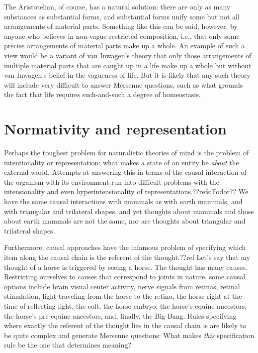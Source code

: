 The Aristotelian, of course, has a natural solution: there are only as many substances as substantial forms, and 
substantial forms unify some but not all arrangements of material parts. Something like this can be said, however,
by anyone who believes in non-vague restricted composition, i.e., that only some precise arrangements of material parts 
make up a whole. An example of such a view would be a variant of van Inwagen's theory that only those arrangements of multiple material parts that are 
caught up in a life make up a whole but without van Inwagen's belief in the vagueness of life. 
But it is likely that any such theory will include very difficult to answer Mersenne questions, such as 
what grounds the fact that life requires such-and-such a degree of homeostasis.

\section{Normativity and representation}
Perhaps the toughest problem for naturalistic theories of mind is the problem of intentionality or representation:
what makes a state of an entity be \textit{about} the external world. Attempts at answering this in terms of the 
causal interaction of the organism with its environment run into difficult problems with the intensionality and 
even hyperintensionality of representations.??refs:Fodor?? We have the same causal interactions with mammals as with earth mammals,
and with triangular and trilateral shapes, and yet thoughts about mammals and those about earth mammals are not the same,
nor are thoughts about triangular and trilateral shapes. 

Furthermore, causal approaches have the infamous problem of specifying which item along the causal chain is the referent of 
the thought.??ref Let's say that my thought of a horse is triggered by seeing a horse. The thought has many causes. 
Restricting ourselves to causes that correspond to joints in nature, some causal options include brain 
visual center activity, nerve signals from retinas, retinal stimulation, light traveling from the horse 
to the retina, the horse right at the time of reflecting light, the colt, the horse embryo, the horse's equine 
ancestors, the horse's pre-equine ancestors, and, finally, the Big Bang. Rules specifying where exactly the referent of the thought lies in the causal 
chain is are likely to be quite complex and generate Mersenne questions: What makes 
\textit{this} specification rule be the one that determines meaning?

